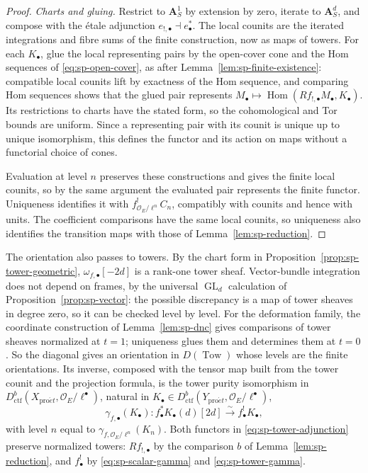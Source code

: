 \documentclass[11pt,a4paper]{article}
\numberwithin{equation}{section}
\theoremstyle{definition}
\theoremstyle{remark}
\newcommand{\proet}{\mathrm{pro}\acute{e}t}
\newcommand{\Dctf}{D^b_{\mathrm{ctf}}}
\DeclareMathOperator{\GL}{GL}
\begin{document}
\begin{proof}
\emph{Charts and gluing.} Restrict to $\mathbf A^1_S$ by extension by
zero, iterate to $\mathbf A^d_S$, and compose with the \'etale adjunction
$e_{!,\bullet}\dashv e_\bullet^*$. The local counits are the iterated
integrations and fibre sums of the finite construction, now as maps of
towers. For each $K_\bullet$, glue the local representing pairs by the
open-cover cone and the Hom sequences of \eqref{eq:sp-open-cover}, as
after Lemma~\ref{lem:sp-finite-existence}: compatible local counits lift
by exactness of the Hom sequence, and comparing Hom sequences shows that
the glued pair represents
$M_\bullet\mapsto\operatorname{Hom}(Rf_{!,\bullet}M_\bullet,K_\bullet)$.
Its restrictions to charts have the stated form, so the cohomological
and Tor bounds are uniform. Since a representing pair with its counit is
unique up to unique isomorphism, this defines the functor and its action
on maps without a functorial choice of cones.

Evaluation at level $n$ preserves these constructions and gives the
finite local counits, so by the same argument the evaluated pair
represents the finite functor. Uniqueness identifies it with
$f_{\mathcal O_E/\ell^n}^!C_n$, compatibly with counits and hence with
units. The coefficient comparisons have the same local counits, so
uniqueness also identifies the transition maps with those of
Lemma~\ref{lem:sp-reduction}.
\end{proof}

The orientation also passes to towers. By the chart form in
Proposition~\ref{prop:sp-tower-geometric}, $\omega_{f,\bullet}[-2d]$ is a
rank-one tower sheaf. Vector-bundle integration does not depend on
frames, by the universal $\GL_d$ calculation of
Proposition~\ref{prop:sp-vector}: the possible discrepancy is a map of
tower sheaves in degree zero, so it can be checked level by level. For
the deformation family, the coordinate construction of
Lemma~\ref{lem:sp-dnc} gives comparisons of tower sheaves normalized at
$t=1$; uniqueness glues them and determines them at $t=0$. So the
diagonal gives an orientation in $D(\operatorname{Tow})$ whose levels
are the finite orientations. Its inverse, composed with the tensor map
built from the tower counit and the projection formula, is the tower
purity isomorphism in $\Dctf(X_{\proet},\mathcal O_E/\ell^\bullet)$, natural in
$K_\bullet\in\Dctf(Y_{\proet},\mathcal O_E/\ell^\bullet)$,
\begin{equation}\label{eq:sp-tower-gamma}
 \gamma_{f,\bullet}(K_\bullet):
 f_\bullet^*K_\bullet(d)[2d]\xrightarrow{\sim}f_\bullet^!K_\bullet ,
\end{equation}
with level $n$ equal to $\gamma_{f,\mathcal O_E/\ell^n}(K_n)$. Both
functors in \eqref{eq:sp-tower-adjunction} preserve normalized towers:
$Rf_{!,\bullet}$ by the comparison $b$ of Lemma~\ref{lem:sp-reduction},
and $f_\bullet^!$ by \eqref{eq:sp-scalar-gamma} and
\eqref{eq:sp-tower-gamma}.
\end{document}
